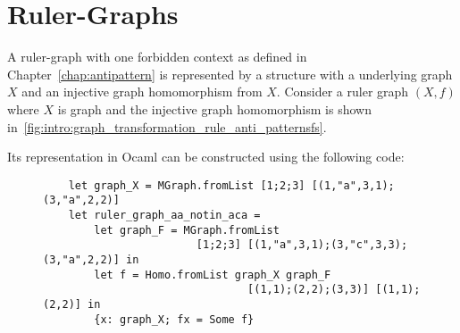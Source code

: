 \section{Ruler-Graphs}
A ruler-graph with one forbidden context as defined in Chapter~\ref{chap:antipattern} is represented by a structure with a underlying graph $X$ and an injective graph homomorphism from $X$. 
Consider a ruler graph $(X, f)$ where $X$ is graph  
and the injective graph homomorphism is shown in~\autoref{fig:intro:graph_transformation_rule_anti_patternsfs}.
 \begin{figure}[!ht]
    \centering
  \caption{}
  \label{fig:intro:graph_transformation_rule_anti_patternsfs}
 \end{figure} 
Its representation in Ocaml
        can be constructed using the following code:
\begin{figure}[!ht]
\begin{verbatim} 
    let graph_X = MGraph.fromList [1;2;3] [(1,"a",3,1);(3,"a",2,2)]
    let ruler_graph_aa_notin_aca = 
        let graph_F = MGraph.fromList 
                        [1;2;3] [(1,"a",3,1);(3,"c",3,3);(3,"a",2,2)] in
        let f = Homo.fromList graph_X graph_F 
                                [(1,1);(2,2);(3,3)] [(1,1);(2,2)] in
        {x: graph_X; fx = Some f}
\end{verbatim}
    \caption{}
    \label{fig:implemented:ruler_graph_representation}
\end{figure}

